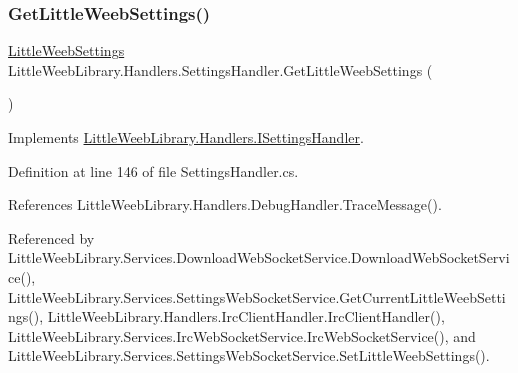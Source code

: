 \mbox{\label{class_little_weeb_library_1_1_handlers_1_1_settings_handler_a53a5c5206eb6d2c58fa9d970c9b97463}} 
\subsubsection{\texorpdfstring{Get\+Little\+Weeb\+Settings()}{GetLittleWeebSettings()}}
{\footnotesize\ttfamily \mbox{\hyperlink{class_little_weeb_library_1_1_settings_1_1_little_weeb_settings}{Little\+Weeb\+Settings}} Little\+Weeb\+Library.\+Handlers.\+Settings\+Handler.\+Get\+Little\+Weeb\+Settings (\begin{DoxyParamCaption}{ }\end{DoxyParamCaption})}



Implements \mbox{\hyperlink{interface_little_weeb_library_1_1_handlers_1_1_i_settings_handler_a493bc8df18211fa8c3874371b809e006}{Little\+Weeb\+Library.\+Handlers.\+I\+Settings\+Handler}}.



Definition at line 146 of file Settings\+Handler.\+cs.



References Little\+Weeb\+Library.\+Handlers.\+Debug\+Handler.\+Trace\+Message().



Referenced by Little\+Weeb\+Library.\+Services.\+Download\+Web\+Socket\+Service.\+Download\+Web\+Socket\+Service(), Little\+Weeb\+Library.\+Services.\+Settings\+Web\+Socket\+Service.\+Get\+Current\+Little\+Weeb\+Settings(), Little\+Weeb\+Library.\+Handlers.\+Irc\+Client\+Handler.\+Irc\+Client\+Handler(), Little\+Weeb\+Library.\+Services.\+Irc\+Web\+Socket\+Service.\+Irc\+Web\+Socket\+Service(), and Little\+Weeb\+Library.\+Services.\+Settings\+Web\+Socket\+Service.\+Set\+Little\+Weeb\+Settings().


